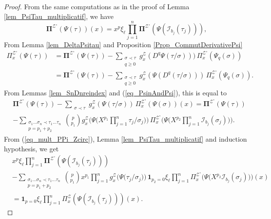 \documentclass[11pt]{preprint}
\newcommand{\mcI}{\mathcal{I}}
\newcommand{\mcZ}{\mathcal{Z}}
\def\PPi{\boldsymbol{\Pi}}
\def\eqref#1{(\ref{#1})}
\begin{document}
\begin{proof}
From the same computations as in the proof of Lemma \ref{lem_PsiTau_multiplicatif}, we have
	\begin{equation}\label{eq_mult_PPi_Zcirc0}
\PPi^{\mcZ^\circ}( \Psi(\tau) )(x) = x^p \xi_\ell \prod_{j=1}^{n} {\PPi}^{\mcZ^\circ} \left( \Psi(\mcI_{b_j}(\tau_j))\right),
\end{equation}
From Lemma \ref{lem_DeltaPsitau} and Proposition \ref{Prop_CommutDerivativePsi}
	\begin{align*}
		\Pi^{\mcZ^\circ}_x( \Psi(\tau) ) &= 	\PPi^{\mcZ^\circ}( \Psi(\tau) ) - \sum_{\substack{\sigma\prec\tau\\ q\geq0}} g_x^\mcZ(D^q\Psi(\tau/\sigma))) \, 	\Pi^{\mcZ^\circ}_x( \Psi_q(\sigma) ) 
		\\
		&=\PPi^{\mcZ^\circ}( \Psi(\tau) ) - \sum_{\substack{\sigma\prec\tau\\ q\geq0}} g_x^\mcZ\left(\Psi(D^q(\tau/\sigma))\right) \, 	\Pi^{\mcZ^\circ}_x( \Psi_q(\sigma) ).
	\end{align*}
From Lemmas \ref{lem_SnDnreindex} and \eqref{eq_PsinAndPsi}, this is equal to 
\begin{align*}
&\PPi^{\mcZ^\circ}( \Psi(\tau) ) - \sum_{\substack{\sigma\prec\tau}} g_x^\mcZ\left(\Psi(\tau/\sigma)\right) \, 	\Pi^{\mcZ^\circ}_x( \Psi(\sigma) )(x)
= \PPi^{\mcZ^\circ}( \Psi(\tau) )  \\& - \sum_{\substack{\sigma_1\dots\sigma_n\prec\tau_1\dots\tau_n\\ p=p_1+p_2}}\binom{p}{p_1} g_x^\mcZ\Big(\Psi\Big(X^{p_1}\prod_{j=1}^{n}\tau_j/\sigma_j\Big)\Big) \, 	\Pi^{\mcZ^\circ}_x\Big( \Psi\Big(X^{p_2}\prod_{j=1}^{n}\mcI_{b_j}(\sigma_j)\Big) \Big).
\end{align*}
From \eqref{eq_mult_PPi_Zcirc}, Lemma \ref{lem_PsiTau_multiplicatif} and induction hypothesis, we get 
\begin{align*}
&x^p \xi_\ell \prod_{j=1}^{n} {\PPi}^{\mcZ^\circ} \left( \Psi(\mcI_{b_j}(\tau_j))\right) 
\\
&-\sum_{\substack{\sigma_1\dots\sigma_n\prec\tau_1\dots\tau_n\\ p=p_1+p_2}}\binom{p}{p_1} x^{p_1}\prod_{j=1}^{n}g_x^\mcZ\Big(\Psi\Big(\tau_j/\sigma_j\Big)\Big) \, 	\mathbf{1}_{p_2=0}\xi_\ell\prod_{j=1}^{n}\Pi^{\mcZ^\circ}_x\Big( \Psi\Big(X^{p_2}\mcI_{b_j}(\sigma_j)\Big) \Big)(x)
\\
&= \mathbf{1}_{p=0}\xi_\ell \prod_{j=1}^{n} {\Pi}_x^\mcZ \left( \Psi(\mcI_{b_j}(\tau_j))\right)(x).
\end{align*}
\end{proof}
\end{document}
